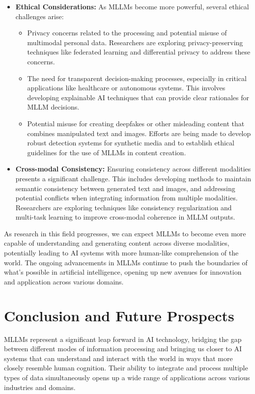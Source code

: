 \begin{itemize}
    \item \textbf{Ethical Considerations:} As MLLMs become more powerful, several ethical challenges arise:
    \begin{itemize}
        \item Privacy concerns related to the processing and potential misuse of multimodal personal data. Researchers are exploring privacy-preserving techniques like federated learning and differential privacy to address these concerns.
        \item The need for transparent decision-making processes, especially in critical applications like healthcare or autonomous systems. This involves developing explainable AI techniques that can provide clear rationales for MLLM decisions.
        \item Potential misuse for creating deepfakes or other misleading content that combines manipulated text and images. Efforts are being made to develop robust detection systems for synthetic media and to establish ethical guidelines for the use of MLLMs in content creation.
    \end{itemize}
    
    \item \textbf{Cross-modal Consistency:} Ensuring consistency across different modalities presents a significant challenge. This includes developing methods to maintain semantic consistency between generated text and images, and addressing potential conflicts when integrating information from multiple modalities. Researchers are exploring techniques like consistency regularization and multi-task learning to improve cross-modal coherence in MLLM outputs.
\end{itemize}

As research in this field progresses, we can expect MLLMs to become even more capable of understanding and generating content across diverse modalities, potentially leading to AI systems with more human-like comprehension of the world. The ongoing advancements in MLLMs continue to push the boundaries of what's possible in artificial intelligence, opening up new avenues for innovation and application across various domains.

\section{Conclusion and Future Prospects}

MLLMs represent a significant leap forward in AI technology, bridging the gap between different modes of information processing and bringing us closer to AI systems that can understand and interact with the world in ways that more closely resemble human cognition. Their ability to integrate and process multiple types of data simultaneously opens up a wide range of applications across various industries and domains.

